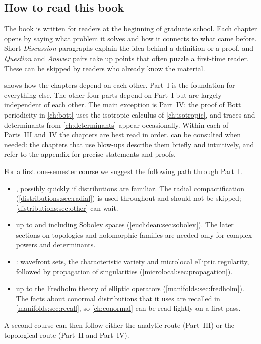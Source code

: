 \subsection*{How to read this book}
The book is written for readers at the beginning of graduate school. Each chapter opens
by saying what problem it solves and how it connects to what came before. Short
\emph{Discussion} paragraphs explain the idea behind a definition or a proof, and
\emph{Question} and \emph{Answer} pairs take up points that often puzzle a first-time
reader. These can be skipped by readers who already know the material.

 shows how the chapters depend on each other. Part~I is
the foundation for everything else. The other four parts depend on Part~I but are
largely independent of each other. The main exception is Part~IV: the proof of Bott
periodicity in \cref{ch:bott} uses the isotropic calculus of \cref{ch:isotropic}, and
traces and determinants from \cref{ch:determinants} appear occasionally. Within each
of Parts~III and~IV the chapters are best read in order.  can be
consulted when needed: the chapters that use blow-ups describe them briefly and
intuitively, and refer to the appendix for precise statements and proofs.

For a first one-semester course we suggest the following path through Part~I.
\begin{itemize}[nosep]
\item {}, possibly quickly if distributions are familiar. The
  radial compactification (\cref{distributions:sec:radial}) is used throughout and
  should not be skipped; \cref{distributions:sec:other} can wait.
\item {} up to and including Sobolev spaces
  (\cref{euclidean:sec:sobolev}). The later sections on topologies and holomorphic
  families are needed only for complex powers and determinants.
\item {}: wavefront sets, the characteristic variety and microlocal
  elliptic regularity, followed by propagation of singularities
  (\cref{microlocal:sec:propagation}).
\item {} up to the Fredholm theory of elliptic operators
  (\cref{manifolds:sec:fredholm}). The facts about conormal distributions that it uses
  are recalled in \cref{manifolds:sec:recall}, so \cref{ch:conormal} can be read
  lightly on a first pass.
\end{itemize}
A second course can then follow either the analytic route (Part~III) or the
topological route (Part~II and Part~IV).

